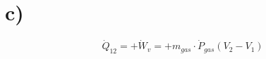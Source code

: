 

\section*{c)}

\begin{equation}
\dot{Q}_{12} = +\dot{W}_v = +m_{gas} \cdot \dot{P}_{gas} \left( V_2 - V_1 \right)
\end{equation}